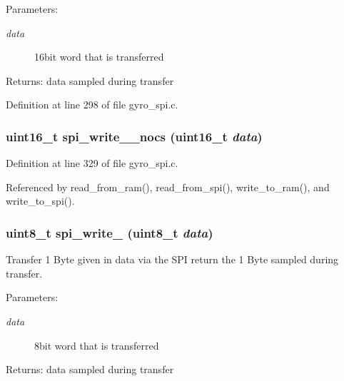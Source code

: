 \begin{Desc}
\item[Parameters:]
\begin{description}
\item[{\em data}]16bit word that is transferred \end{description}
\end{Desc}
\begin{Desc}
\item[Returns:]data sampled during transfer \end{Desc}


Definition at line 298 of file gyro\_\-spi.c.
\subsubsection{\setlength{\rightskip}{0pt plus 5cm}uint16\_\-t spi\_\-write\_\_\-nocs (uint16\_\-t {\em data})}\label{group__ro__spi_g3d9ca457fe2d0967e9754da3aea2e548}




Definition at line 329 of file gyro\_\-spi.c.

Referenced by read\_\-from\_\-ram(), read\_\-from\_\-spi(), write\_\-to\_\-ram(), and write\_\-to\_\-spi().
\subsubsection{\setlength{\rightskip}{0pt plus 5cm}uint8\_\-t spi\_\-write\_ (uint8\_\-t {\em data})}\label{group__ro__spi_g710be1737d6c2637145427d3e776edfd}


Transfer 1 Byte given in data via the SPI return the 1 Byte sampled during transfer. 

\begin{Desc}
\item[Parameters:]
\begin{description}
\item[{\em data}]8bit word that is transferred \end{description}
\end{Desc}
\begin{Desc}
\item[Returns:]data sampled during transfer \end{Desc}


